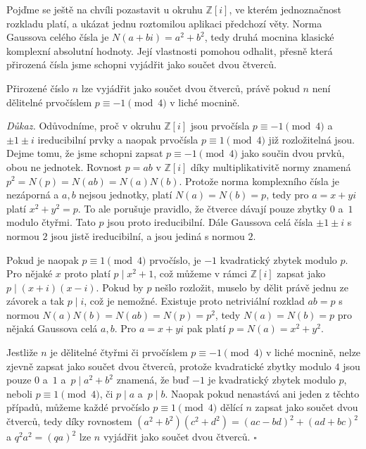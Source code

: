 \documentclass[12pt]{report}
\begin{document}
Pojďme se ještě na chvíli pozastavit u okruhu $\mathbb{Z}[i]$, ve kterém jednoznačnost rozkladu platí, a ukázat jednu roztomilou aplikaci předchozí věty. Norma Gaussova celého čísla je $N(a+bi) = a^2+b^2$, tedy druhá mocnina klasické komplexní absolutní hodnoty. Její vlastnosti pomohou odhalit, přesně která přirozená čísla jsme schopni vyjádřit jako součet dvou čtverců.


\begin{veta} 
Přirozené číslo $n$ lze vyjádřit jako součet dvou čtverců, právě pokud $n$ není dělitelné prvočíslem $p \equiv -1 \pmod{4}$ v liché mocnině.
\end{veta}

\noindent \textit{Důkaz.} Odůvodníme, proč v okruhu $\mathbb{Z}[i]$ jsou prvočísla $p \equiv -1 \pmod{4}$ a $\pm 1 \pm i$ ireducibilní prvky a naopak prvočísla $p \equiv 1 \pmod{4}$ již rozložitelná jsou. Dejme tomu, že jsme schopni zapsat $p \equiv -1 \pmod{4}$ jako součin dvou prvků, obou ne jednotek. Rovnost $p = ab$ v $\mathbb{Z}[i]$ díky multiplikativitě normy znamená $p^2 = N(p)=N(ab)=N(a)N(b)$. Protože norma komplexního čísla je nezáporná a $a,b$ nejsou jednotky, platí $N(a)=N(b)=p$, tedy pro $a=x+yi$ platí $x^2+y^2 = p$. To ale porušuje pravidlo, že čtverce dávají pouze zbytky $0$ a~$1$ modulo čtyřmi. Tato $p$ jsou proto ireducibilní. Dále Gaussova celá čísla $\pm 1 \pm i$ s normou $2$ jsou jistě ireducibilní, a jsou jediná s normou $2$.

Pokud je naopak $p \equiv 1 \pmod{4}$ prvočíslo, je $-1$ kvadratický zbytek modulo $p$. Pro nějaké $x$ proto platí $p \mid x^2+1$, což můžeme v rámci $\mathbb{Z}[i]$ zapsat jako $p \mid (x+i)(x-i)$. Pokud by $p$ nešlo rozložit, muselo by dělit právě jednu ze závorek a tak $p \mid i$, což je nemožné. Existuje proto netriviální rozklad $ab = p$ s normou $N(a)N(b) = N(ab) = N(p)=p^2$, tedy $N(a)=N(b)=p$ pro nějaká Gaussova celá $a,b$. Pro $a = x+yi$ pak platí $p = N(a) = x^2+y^2$.

Jestliže $n$ je dělitelné čtyřmi či prvočíslem $p \equiv -1 \pmod{4}$ v liché mocnině, nelze zjevně zapsat jako součet dvou čtverců, protože kvadratické zbytky modulo $4$ jsou pouze $0$ a~$1$ a~$p \mid a^2+b^2$ znamená, že buď $-1$ je kvadratický zbytek modulo $p$, neboli $p \equiv 1 \pmod{4}$, či $p \mid a$ a~$p \mid b$. Naopak pokud nenastává ani jeden z těchto případů, můžeme každé prvočíslo $p \equiv 1 \pmod{4}$ dělící $n$ zapsat jako součet dvou čtverců, tedy díky rovnostem $(a^2+b^2)(c^2+d^2) = (ac-bd)^2+(ad+bc)^2$ a $q^2 a^2 = (qa)^2$ lze $n$ vyjádřit jako součet dvou čtverců. \hfill $\square$\\
\end{document}
